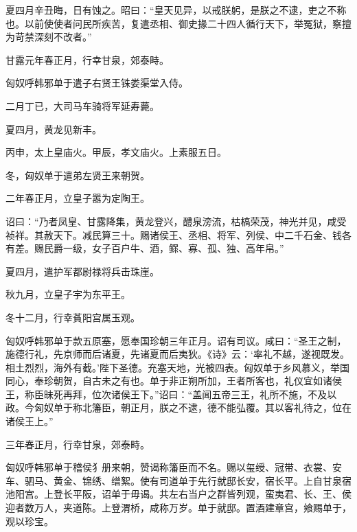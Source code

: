 \documentclass[12pt,UTF8]{ctexbook}
\begin{document}
夏四月辛丑晦，日有蚀之。昭曰：“皇天见异，以戒朕躬，是朕之不逮，吏之不称也。以前使使者问民所疾苦，复遣丞相、御史掾二十四人循行天下，举冤狱，察擅为苛禁深刻不改者。”



甘露元年春正月，行幸甘泉，郊泰畤。



匈奴呼韩邪单于遣子右贤王铢娄渠堂入侍。



二月丁已，大司马车骑将军延寿薨。



夏四月，黄龙见新丰。



丙申，太上皇庙火。甲辰，孝文庙火。上素服五日。



冬，匈奴单于遣弟左贤王来朝贺。



二年春正月，立皇子嚣为定陶王。



诏曰：“乃者凤皇、甘露降集，黄龙登兴，醴泉滂流，枯槁荣茂，神光并见，咸受祯祥。其赦天下。减民算三十。赐诸侯王、丞相、将军、列侯、中二千石金、钱各有差。赐民爵一级，女子百户牛、酒，鳏、寡、孤、独、高年帛。”



夏四月，遣护军都尉禄将兵击珠崖。



秋九月，立皇子宇为东平王。



冬十二月，行幸萯阳宫属玉观。



匈奴呼韩邪单于款五原塞，愿奉国珍朝三年正月。诏有司议。咸曰：“圣王之制，施德行礼，先京师而后诸夏，先诸夏而后夷狄。《诗》云：‘率礼不越，遂视既发。相土烈烈，海外有截。’陛下圣德。充塞天地，光被四表。匈奴单于乡风慕义，举国同心，奉珍朝贺，自古未之有也。单于非正朔所加，王者所客也，礼仪宜如诸侯王，称臣昧死再拜，位次诸侯王下。”诏曰：“盖闻五帝三王，礼所不施，不及以政。今匈奴单于称北籓臣，朝正月，朕之不逮，德不能弘覆。其以客礼待之，位在诸侯王上。”



三年春正月，行幸甘泉，郊泰畤。



匈奴呼韩邪单于稽侯犭册来朝，赞谒称籓臣而不名。赐以玺绶、冠带、衣裳、安车、驷马、黄金、锦绣、缯絮。使有司道单于先行就邸长安，宿长平。上自甘泉宿池阳宫。上登长平阪，诏单于毋谒。共左右当户之群皆列观，蛮夷君、长、王、侯迎者数万人，夹道陈。上登渭桥，咸称万岁。单于就邸。置酒建章宫，飨赐单于，观以珍宝。
\end{document}
